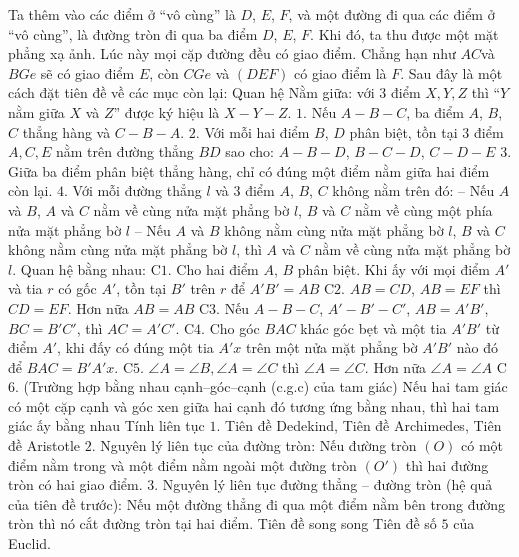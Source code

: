 \documentclass{article}
\begin{document}
	Ta thêm vào các điểm ở ``vô cùng'' là $D$, $E$, $F$, và một đường đi qua các điểm ở ``vô cùng'', là đường tròn đi qua ba điểm $D$, $E$, $F$. Khi đó, ta thu được một mặt phẳng xạ ảnh. Lúc này mọi cặp đường đều có giao điểm. Chẳng hạn như $AC$và $BGe$ sẽ có giao điểm $E$, còn $CGe$ và $(DEF)$ có giao điểm là $F$.
	\vskip 0.1cm
	Sau đây là một cách đặt tiên đề về các mục còn lại: 
	\vskip 0.1cm
	Quan hệ Nằm giữa: với $3$ điểm $X, Y, Z$ thì ``$Y$ nằm giữa $X$ và $Z$'' được ký hiệu là $X-Y-Z$.
	\vskip 0.1cm
	$1.$ Nếu $A - B - C$, ba điểm $A$, $B$, $C$ thẳng hàng và $C - B - A$.
	\vskip 0.1cm
	$2.$ Với mỗi hai điểm $B$, $D$ phân biệt, tồn tại $3$ điểm $A, C, E$ nằm trên đường thẳng $BD$ sao cho: $A - B - D$, $B - C - D$, $C - D - E$ 
	\vskip 0.1cm
	$3.$ Giữa ba điểm phân biệt thẳng hàng, chỉ có đúng một điểm nằm giữa hai điểm còn lại.
	\vskip 0.1cm
	$4.$ Với mỗi đường thẳng $l$ và $3$ điểm $A$, $B$, $C$ không nằm trên đó:
	\vskip 0.1cm
	-- Nếu $A$ và $B$, $A$ và $C$ nằm về cùng nửa mặt phẳng bờ $l$, $B$ và $C$ nằm về cùng một phía nửa mặt phẳng bờ $l$
	\vskip 0.1cm
	-- Nếu $A$ và $B$ không nằm cùng nửa mặt phẳng bờ $l$, $B$ và $C$ không nằm cùng nửa mặt phẳng bờ $l$, thì $A$ và $C$ nằm về cùng nửa mặt phẳng bờ $l$.
	\vskip 0.1cm
	Quan hệ bằng nhau: 
	\vskip 0.1cm
	C$1$. Cho hai điểm $A$, $B$ phân biệt. Khi ấy với mọi điểm $A'$ và tia $r$ có gốc $A'$, tồn tại $B'$ trên $r$ để $A'B' = AB$ 
	\vskip 0.1cm
	C$2$. $AB = CD$, $AB = EF$ thì $CD = EF$. Hơn nữa $AB = AB$
	\vskip 0.1cm
	C$3$. Nếu $A - B - C$, $A' - B' - C'$, $AB = A'B'$, $BC = B'C'$, thì $AC = A'C'$.
	\vskip 0.1cm
	C$4$. Cho góc $BAC$ khác góc bẹt và một tia $A'B'$ từ điểm $A'$, khi đấy có đúng một tia $A'x$ trên một nửa mặt phẳng bờ $A'B'$ nào đó để $BAC = B'A'x$.
	\vskip 0.1cm
	C$5$. $ \angle A = \angle B, \angle A = \angle C$ thì $ \angle A = \angle C$. Hơn nữa $ \angle A = \angle A$ 
	\vskip 0.1cm
	C$6$. (Trường hợp bằng nhau cạnh--góc--cạnh (c.g.c) của tam giác) Nếu hai tam giác có một cặp cạnh và góc xen giữa hai cạnh đó tương ứng bằng nhau, thì hai tam giác ấy bằng nhau
	\vskip 0.1cm
	Tính liên tục
	\vskip 0.1cm
	$1.$ Tiên đề Dedekind, Tiên đề Archimedes, Tiên đề Aristotle
	\vskip 0.1cm
	$2.$ Nguyên lý liên tục của đường tròn: Nếu đường tròn $(O)$ có một điểm nằm trong và một điểm nằm ngoài một đường tròn $(O')$ thì hai đường tròn có hai giao điểm.
	\vskip 0.1cm
	$3.$ Nguyên lý liên tục đường thẳng -- đường tròn (hệ quả của tiên đề trước): Nếu một đường thẳng đi qua một điểm nằm bên trong đường tròn thì nó cắt đường tròn tại hai điểm.
	\vskip 0.1cm
	Tiên đề song song
	\vskip 0.1cm
	Tiên đề số $5$ của Euclid.
\end{document}
